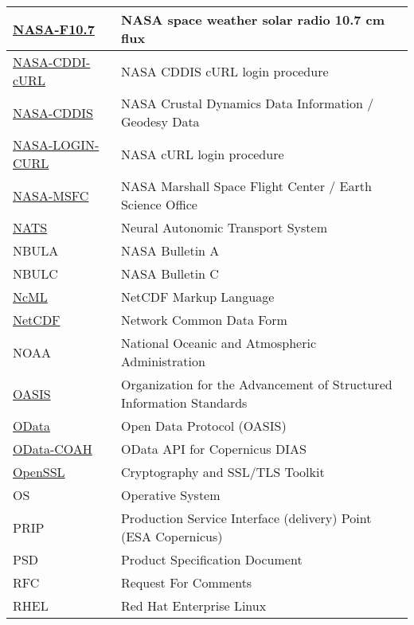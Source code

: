 \documentclass[dec_sum_main.tex]{subfiles}
\begin{document}
\begin{longtable}{|m{2.8cm}|m{10cm}|}
    \href{https://www.nasa.gov/msfcsolar}{NASA-F10.7} & NASA space weather solar radio 10.7 cm flux \\ \hline
    \href{https://cddis.nasa.gov/About/CDDIS_File_Download_Documentation.html}{NASA-CDDI-cURL} & NASA CDDIS cURL login procedure \\ \hline
    \href{https://cddis.nasa.gov/About/Background.html}{NASA-CDDIS} & NASA Crustal Dynamics Data Information / Geodesy Data \\ \hline
    \href{https://wiki.earthdata.nasa.gov/display/EL/How+To+Access+Data+With+cURL+And+Wget}{NASA-LOGIN-CURL} & NASA cURL login procedure\\ \hline       
    \href{https://weather.msfc.nasa.gov/}{NASA-MSFC} & NASA Marshall Space Flight Center / Earth Science Office \\ \hline 
    \href{https://docs.nats.io/reference/faq}{NATS} & Neural Autonomic Transport System \\ \hline
    NBULA & NASA Bulletin A \\ \hline
    NBULC & NASA Bulletin C \\ \hline
    \href{https://www.unidata.ucar.edu/software/netcdf-java/v4.6/ncml/index.htm}{NcML} & NetCDF Markup Language \\ \hline
    \href{https://www.unidata.ucar.edu/software/netcdf/}{NetCDF} & Network Common Data Form \\ \hline
	NOAA & National Oceanic and Atmospheric Administration \\ \hline
	\href{https://www.oasis-open.org/}{OASIS} & Organization for the Advancement of Structured Information Standards \\ \hline
	\href{https://www.odata.org/documentation/}{OData} & Open Data Protocol (OASIS) \\ \hline
    \href{https://scihub.copernicus.eu/twiki/do/view/SciHubUserGuide/ODataAPI?redirectedfrom=SciHubUserGuide.7ODataAPI}{OData-COAH} & OData API for Copernicus DIAS \\ \hline
    \href{https://wiki.openssl.org/index.php/Main_Page}{OpenSSL} & Cryptography and SSL/TLS Toolkit \\ \hline    
	OS & Operative System \\ \hline
	PRIP & Production Service Interface (delivery) Point (ESA Copernicus) \\ \hline
    PSD & Product Specification Document \\ \hline
	RFC & Request For Comments \\ \hline
	RHEL & Red Hat Enterprise Linux \\ \hline

\end{longtable}
\end{document}
